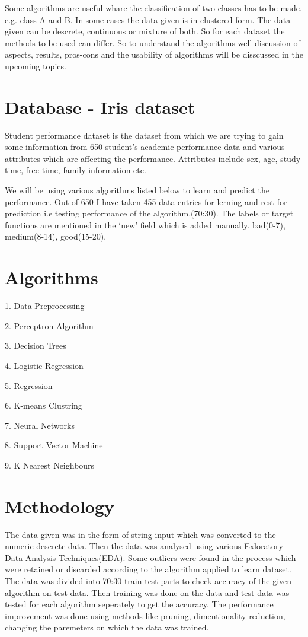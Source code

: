 \documentclass[conference,compsoc]{IEEEtran}
\begin{document}
Some algorithms are useful whare the classification of two classes has to be made. e.g. class A and B. In some cases the data given is in clustered form. The data given can be descrete, continuous or mixture of both. So for each dataset the methods to be used can differ. So to understand the algorithms well discussion of aspects, results, pros-cons and the usability of algorithms will be disscussed in the upcoming topics. 


\section{Database - Iris dataset}
Student performance dataset is the dataset from which we are trying to gain some information from 650 student’s academic performance data and various attributes which are affecting the performance. Attributes include sex, age, study time, free time, family information etc.
 
We will be using various algorithms listed below to learn and predict the performance. Out of 650 I have taken 455 data entries for lerning and rest for prediction i.e testing performance of the algorithm.(70:30). The labels or target functions are mentioned in the ‘new’ field which is added manually. bad(0-7), medium(8-14), good(15-20).
 

\section{Algorithms}
1. Data Preprocessing

2. Perceptron Algorithm

3. Decision Trees

4. Logistic Regression

5. Regression

6. K-means Clustring

7. Neural Networks

8. Support Vector Machine

9. K Nearest Neighbours



\section{Methodology}

The data given was in the form of string input which was converted to the numeric descrete data. Then the data was analysed using various Exloratory Data Analysis Techniques(EDA). Some outliers were found in the process which were retained or discarded according to the algorithm applied to learn dataset. The data was divided into 70:30 train test parts to check accuracy of the given algorithm on test data. Then training was done on the data and test data was tested for each algorithm seperately to get the accuracy. The performance improvement was done using methods like pruning, dimentionality reduction, changing the paremeters on which the data was trained.\\
\end{document}
